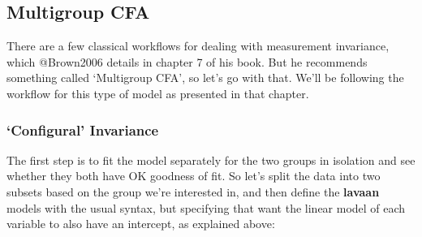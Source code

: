 \documentclass[
  letterpaper,
  DIV=11,
  numbers=noendperiod]{scrreprt}
\begin{document}
\hypertarget{multigroup-cfa}{%
\subsection*{Multigroup CFA}\label{multigroup-cfa}}

There are a few classical workflows for dealing with measurement
invariance, which @Brown2006 details in chapter 7 of his book. But he
recommends something called `Multigroup CFA', so let's go with that.
We'll be following the workflow for this type of model as presented in
that chapter.

\hypertarget{configural-invariance}{%
\subsubsection{`Configural' Invariance}\label{configural-invariance}}

The first step is to fit the model separately for the two groups in
isolation and see whether they both have OK goodness of fit. So let's
split the data into two subsets based on the group we're interested in,
and then define the \textbf{lavaan} models with the usual syntax, but
specifying that want the linear model of each variable to also have an
intercept, as explained above:
\end{document}
